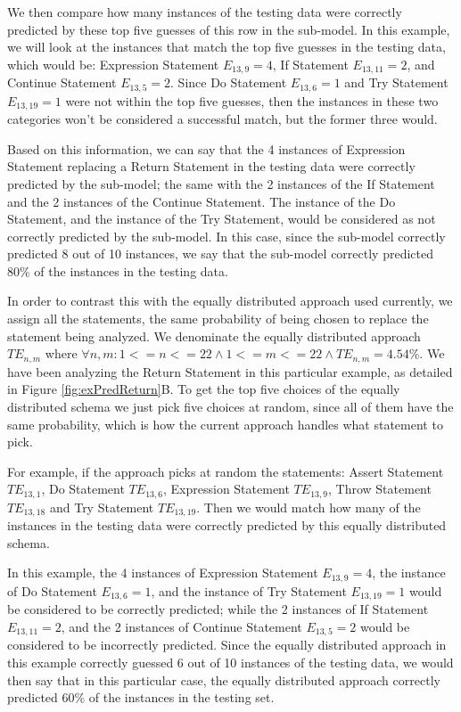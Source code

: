 \documentclass[conference]{IEEEtran}
\begin{document}
We then compare how many instances of the testing data were correctly predicted 
by these top five guesses of this row in the sub-model. In this example, we will 
look at the instances that match the top five guesses in the testing data, which 
would be: Expression Statement $E_{13,9} = 4$, If Statement $E_{13,11} = 2$, and 
Continue Statement $E_{13,5} = 2$. Since Do 
Statement $E_{13,6} = 1$ and Try Statement $E_{13,19} = 1$ were not within the 
top five guesses, then the 
instances in these two categories won't be considered a successful match, but 
the former three would. 

Based on this information, we can say that the 4 instances of Expression 
Statement replacing a Return Statement in the testing data were correctly 
predicted by the sub-model; the same with the 2 instances of the If Statement 
and the 2 instances of the Continue Statement. The instance of the Do Statement, 
and the instance of the Try Statement, would be considered as not correctly 
predicted by the sub-model. In this case, since the sub-model correctly 
predicted 8 out of 10 instances, we say that the sub-model correctly predicted 
80\% of the instances in the testing data. 

In order to contrast this with the equally distributed approach used currently, 
we assign all the statements, the same probability of being chosen to replace 
the statement being analyzed. We denominate the equally distributed approach 
$TE_{n,m}$ where $\forall n,m: 1<=n<=22 \land 1<=m<=22 \land TE_{n,m} = 4.54\%$. 
We have been analyzing the Return Statement in this particular example, as 
detailed in Figure \ref{fig:exPredReturn}B. To get the top five choices of the 
equally distributed schema we just pick five choices at random, since all of 
them have the same probability, which is how the current approach handles what 
statement to pick.

For example, if the approach picks at random the statements: Assert Statement 
$TE_{13,1}$, 
Do Statement $TE_{13,6}$, Expression Statement $TE_{13,9}$, Throw Statement 
$TE_{13,18}$ and Try Statement $TE_{13,19}$. Then we 
would match how many of the instances in the testing data were correctly 
predicted by this equally distributed schema.

In this example, the 4 instances of Expression Statement $E_{13,9} = 4$, the 
instance of Do 
Statement  $E_{13,6} = 1$, and the instance of Try Statement $E_{13,19} = 1$ 
would be considered to be correctly 
predicted; while the 2 instances of If Statement $E_{13,11} = 2$, and the 2 
instances of 
Continue Statement $E_{13,5} = 2$ would be considered to be incorrectly 
predicted. Since the 
equally distributed approach in this example correctly guessed 6 out of 10 
instances of the testing data, we would then say that in this particular case, 
the equally distributed approach correctly predicted 60\% of the instances in 
the testing set.  
\end{document}
